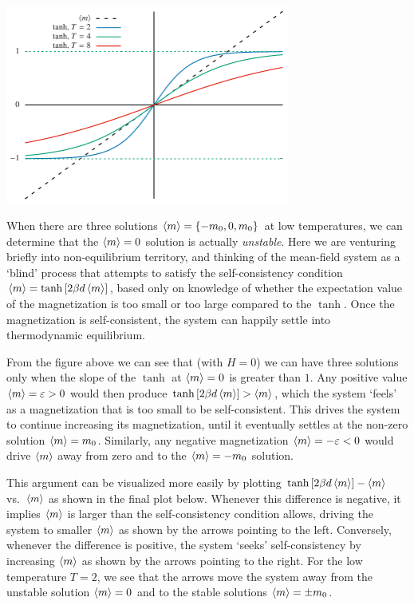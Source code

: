 \begin{center}\includegraphics[width=0.7\textwidth]{figs/unit09_consistency_beta.pdf}\end{center}

When there are three solutions $\left\langle m \right\rangle = \left\{-m_0, 0, m_0\right\}$ at low temperatures, we can determine that the $\left\langle m \right\rangle = 0$ solution is actually \textit{unstable}.
Here we are venturing briefly into non-equilibrium territory, and thinking of the mean-field system as a `blind' process that attempts to satisfy the self-consistency condition $\left\langle m \right\rangle = \tanh\left[2\beta d\left\langle m \right\rangle\right]$, based only on knowledge of whether the expectation value of the magnetization is too small or too large compared to the $\tanh$. %
Once the magnetization is self-consistent, the system can happily settle into thermodynamic equilibrium.

From the figure above we can see that (with $H = 0$) we can have three solutions only when the slope of the $\tanh$ at $\left\langle m \right\rangle = 0$ is greater than $1$. %
Any positive value $\left\langle m \right\rangle = \varepsilon > 0$ would then produce $\tanh\left[2\beta d\left\langle m \right\rangle\right] > \left\langle m \right\rangle$, which the system `feels' as a magnetization that is too small to be self-consistent.
This drives the system to continue increasing its magnetization, until it eventually settles at the non-zero solution $\left\langle m \right\rangle = m_0$.
Similarly, any negative magnetization $\left\langle m \right\rangle = -\varepsilon < 0$ would drive $\left\langle m \right\rangle$ away from zero and to the $\left\langle m \right\rangle = -m_0$ solution.

This argument can be visualized more easily by plotting $\tanh\left[2\beta d\left\langle m \right\rangle\right] - \left\langle m \right\rangle$ vs.\ $\left\langle m \right\rangle$ as shown in the final plot below.
Whenever this difference is negative, it implies $\left\langle m \right\rangle$ is larger than the self-consistency condition allows, driving the system to smaller $\left\langle m \right\rangle$ as shown by the arrows pointing to the left.
Conversely, whenever the difference is positive, the system `seeks' self-consistency by increasing $\left\langle m \right\rangle$ as shown by the arrows pointing to the right.
For the low temperature $T = 2$, we see that the arrows move the system away from the unstable solution $\left\langle m \right\rangle = 0$ and to the stable solutions $\left\langle m \right\rangle = \pm m_0$.

